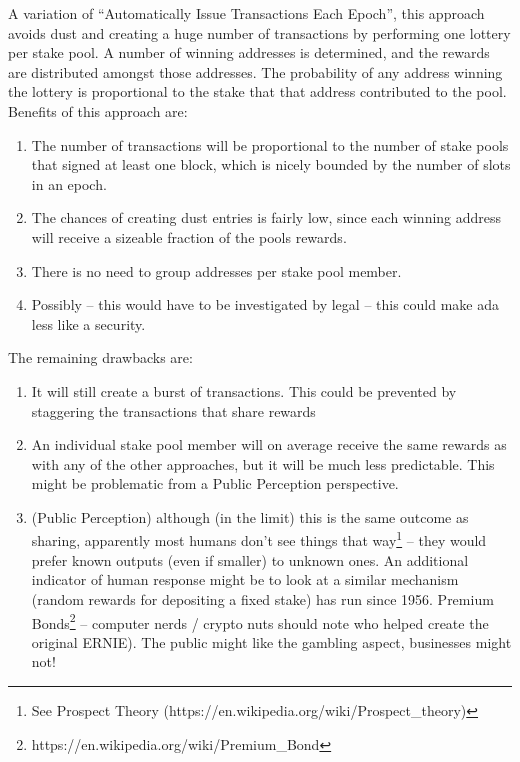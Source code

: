 \documentclass[11pt,a4paper,dvipsnames,twosided]{article}
\begin{document}
A variation of ``Automatically Issue Transactions Each Epoch'', this
approach avoids dust and creating a huge number of transactions by
performing one lottery per stake pool. A number of winning addresses is
determined, and the rewards are distributed amongst those addresses. The
probability of any address winning the lottery is proportional to the
stake that that address contributed to the pool. Benefits of this
approach are:

\begin{enumerate}
\item
  The number of transactions will be proportional to the number of stake
  pools that signed at least one block, which is nicely bounded by the
  number of slots in an epoch.
\item
  The chances of creating dust entries is fairly low, since each winning
  address will receive a sizeable fraction of the pools rewards.
\item
  There is no need to group addresses per stake pool member.
\item
  Possibly -- this would have to be investigated by legal -- this could
  make ada less like a security.
\end{enumerate}

The remaining drawbacks are:

\begin{enumerate}
\item
  It will still create a burst of transactions. This could be prevented
  by staggering the transactions that share rewards
\item
  An individual stake pool member will on average receive the same
  rewards as with any of the other approaches, but it will be much less
  predictable. This might be problematic from a Public Perception
  perspective.
\item
  (Public Perception) although (in the limit) this is the same outcome
  as sharing, apparently most humans don't see things that way\footnote{See
  Prospect Theory (https://en.wikipedia.org/wiki/Prospect\_theory)} --
  they would prefer known outputs (even if smaller) to unknown ones.
  An additional indicator of human response might be to look at a
  similar mechanism (random rewards for depositing a fixed stake) has
  run since 1956. Premium
  Bonds\footnote{https://en.wikipedia.org/wiki/Premium\_Bond} --
  computer nerds /
  crypto nuts should note who helped create the original ERNIE). The
  public might like the gambling aspect, businesses might not!
\end{enumerate}
\end{document}
